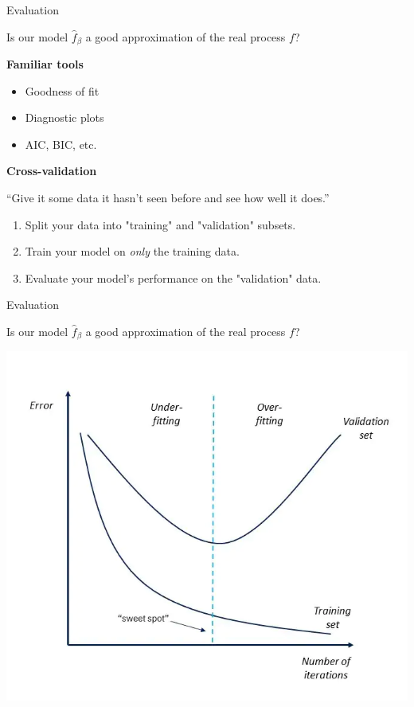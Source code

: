 \begin{frame}[t]{Evaluation}

	\pause

	Is our model $\hat f_\beta$ a good approximation of the real process $f$?


	\pause \bigskip

	\textbf{Familiar tools}

	\begin{itemize}[<+->]
		\item Goodness of fit
		\item Diagnostic plots
		\item AIC, BIC, etc.
	\end{itemize}

	\pause \bigskip

	\textbf{Cross-validation}

	``Give it some data it hasn't seen before and see how well it does.''

	\medskip \pause

	\begin{enumerate}[<+->]
		\item Split your data into "training" and "validation" subsets.
		\item Train your model on \emph{only} the training data.
		\item Evaluate your model's performance on the "validation" data.
	\end{enumerate}
\end{frame}

\begin{frame}[t]{Evaluation}

	Is our model $\hat f_\beta$ a good approximation of the real process $f$?

	\begin{center}
		\includegraphics[width=.75\textwidth]{over-under-fitting.png}
	\end{center}

\end{frame}

